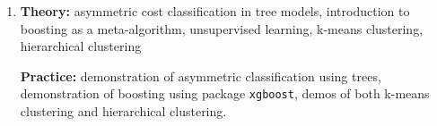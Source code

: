 \begin{enumerate}[(1)]
\item \textbf{Theory:} asymmetric cost classification in tree models, introduction to boosting as a meta-algorithm, unsupervised learning, k-means clustering, hierarchical clustering %

\textbf{Practice:} demonstration of asymmetric classification using trees, demonstration of boosting using package \texttt{xgboost}, demos of both k-means clustering and hierarchical clustering. %
\end{enumerate}

